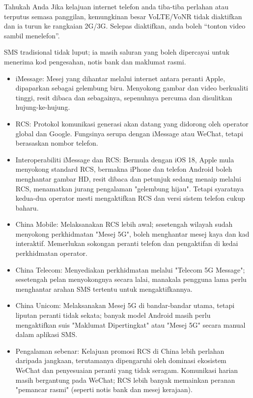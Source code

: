 \begin{tcbinfo}{Tahukah Anda}
Jika kelajuan internet telefon anda tiba-tiba perlahan atau terputus semasa panggilan, kemungkinan besar VoLTE/VoNR tidak diaktifkan dan ia turun ke rangkaian 2G/3G. Selepas diaktifkan, anda boleh “tonton video sambil menelefon”.

\end{tcbinfo}


SMS tradisional tidak luput; ia masih saluran yang boleh dipercayai untuk menerima kod pengesahan, notis bank dan maklumat rasmi.

\begin{itemize}
  \item iMessage: Mesej yang dihantar melalui internet antara peranti Apple, dipaparkan sebagai gelembung biru. Menyokong gambar dan video berkualiti tinggi, resit dibaca dan sebagainya, sepenuhnya percuma dan disulitkan hujung-ke-hujung.
  \item RCS: Protokol komunikasi generasi akan datang yang didorong oleh operator global dan Google. Fungsinya serupa dengan iMessage atau WeChat, tetapi berasaskan nombor telefon.
  \item Interoperabiliti iMessage dan RCS: Bermula dengan iOS 18, Apple mula menyokong standard RCS, bermakna iPhone dan telefon Android boleh menghantar gambar HD, resit dibaca dan petunjuk sedang menaip melalui RCS, menamatkan jurang pengalaman "gelembung hijau". Tetapi syaratnya kedua-dua operator mesti mengaktifkan RCS dan versi sistem telefon cukup baharu.
\end{itemize}


\begin{itemize}
  \item China Mobile: Melaksanakan RCS lebih awal; sesetengah wilayah sudah menyokong perkhidmatan "Mesej 5G", boleh menghantar mesej kaya dan kad interaktif. Memerlukan sokongan peranti telefon dan pengaktifan di kedai perkhidmatan operator.
  \item China Telecom: Menyediakan perkhidmatan melalui "Telecom 5G Message"; sesetengah pelan menyokongnya secara lalai, manakala pengguna lama perlu menghantar arahan SMS tertentu untuk mengaktifkannya.
  \item China Unicom: Melaksanakan Mesej 5G di bandar-bandar utama, tetapi liputan peranti tidak sekata; banyak model Android masih perlu mengaktifkan suis "Maklumat Dipertingkat" atau "Mesej 5G" secara manual dalam aplikasi SMS.
  \item Pengalaman sebenar: Kelajuan promosi RCS di China lebih perlahan daripada jangkaan, terutamanya dipengaruhi oleh dominasi ekosistem WeChat dan penyesuaian peranti yang tidak seragam. Komunikasi harian masih bergantung pada WeChat; RCS lebih banyak memainkan peranan "pemancar rasmi" (seperti notis bank dan mesej kerajaan).
\end{itemize}

